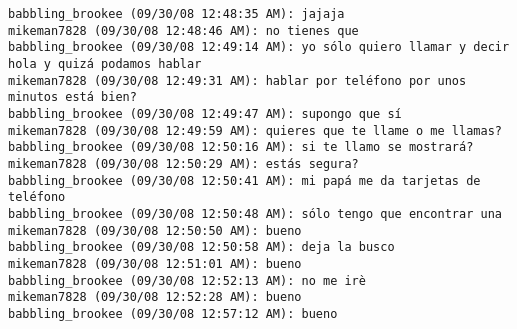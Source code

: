 \begin{verbatim}
babbling_brookee (09/30/08 12:48:35 AM): jajaja
mikeman7828 (09/30/08 12:48:46 AM): no tienes que
babbling_brookee (09/30/08 12:49:14 AM): yo sólo quiero llamar y decir hola y quizá podamos hablar
mikeman7828 (09/30/08 12:49:31 AM): hablar por teléfono por unos minutos está bien?
babbling_brookee (09/30/08 12:49:47 AM): supongo que sí
mikeman7828 (09/30/08 12:49:59 AM): quieres que te llame o me llamas?
babbling_brookee (09/30/08 12:50:16 AM): si te llamo se mostrará?
mikeman7828 (09/30/08 12:50:29 AM): estás segura?
babbling_brookee (09/30/08 12:50:41 AM): mi papá me da tarjetas de teléfono
babbling_brookee (09/30/08 12:50:48 AM): sólo tengo que encontrar una
mikeman7828 (09/30/08 12:50:50 AM): bueno
babbling_brookee (09/30/08 12:50:58 AM): deja la busco
mikeman7828 (09/30/08 12:51:01 AM): bueno
babbling_brookee (09/30/08 12:52:13 AM): no me irè
mikeman7828 (09/30/08 12:52:28 AM): bueno
babbling_brookee (09/30/08 12:57:12 AM): bueno

\end{verbatim}